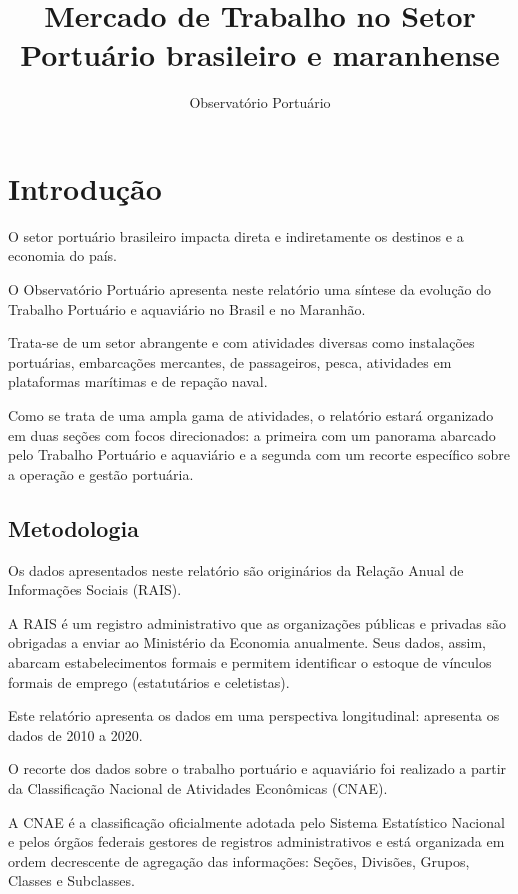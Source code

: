 \documentclass[
]{article}
\title{Mercado de Trabalho no Setor Portuário brasileiro e maranhense}
\author{Observatório Portuário}
\date{}
\begin{document}
\maketitle

{
\setcounter{tocdepth}{2}
\tableofcontents
}
\hypertarget{introduuxe7uxe3o}{%
\section{Introdução}\label{introduuxe7uxe3o}}

O setor portuário brasileiro impacta direta e indiretamente os destinos
e a economia do país.

O Observatório Portuário apresenta neste relatório uma síntese da
evolução do Trabalho Portuário e aquaviário no Brasil e no Maranhão.

Trata-se de um setor abrangente e com atividades diversas como
instalações portuárias, embarcações mercantes, de passageiros, pesca,
atividades em plataformas marítimas e de repação naval.

Como se trata de uma ampla gama de atividades, o relatório estará
organizado em duas seções com focos direcionados: a primeira com um
panorama abarcado pelo Trabalho Portuário e aquaviário e a segunda com
um recorte específico sobre a operação e gestão portuária.

\hypertarget{metodologia}{%
\subsection{Metodologia}\label{metodologia}}

Os dados apresentados neste relatório são originários da Relação Anual
de Informações Sociais (RAIS).

A RAIS é um registro administrativo que as organizações públicas e
privadas são obrigadas a enviar ao Ministério da Economia anualmente.
Seus dados, assim, abarcam estabelecimentos formais e permitem
identificar o estoque de vínculos formais de emprego (estatutários e
celetistas).

Este relatório apresenta os dados em uma perspectiva longitudinal:
apresenta os dados de 2010 a 2020.

O recorte dos dados sobre o trabalho portuário e aquaviário foi
realizado a partir da Classificação Nacional de Atividades Econômicas
(CNAE).

A CNAE é a classificação oficialmente adotada pelo Sistema Estatístico
Nacional e pelos órgãos federais gestores de registros administrativos e
está organizada em ordem decrescente de agregação das informações:
Seções, Divisões, Grupos, Classes e Subclasses.
\end{document}
